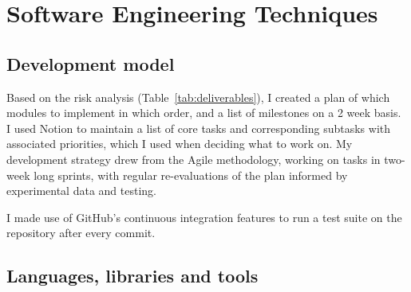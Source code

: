 \documentclass[12pt,a4paper,twoside,openright]{report}
\theoremstyle{definition}
\begin{document}
\section{Software Engineering Techniques}

\subsection{Development model}
Based on the risk analysis (Table~\ref{tab:deliverables}), I created a plan of which modules to implement in which order, and a list of milestones on a 2 week basis. I used Notion to maintain a list of core tasks and corresponding subtasks with associated priorities, which I used when deciding what to work on. My development strategy drew from the Agile methodology, working on tasks in two-week long sprints, with regular re-evaluations of the plan informed by experimental data and testing.

I made use of GitHub's continuous integration features to run a test suite on the repository after every commit.  

\subsection{Languages, libraries and tools}
\end{document}
